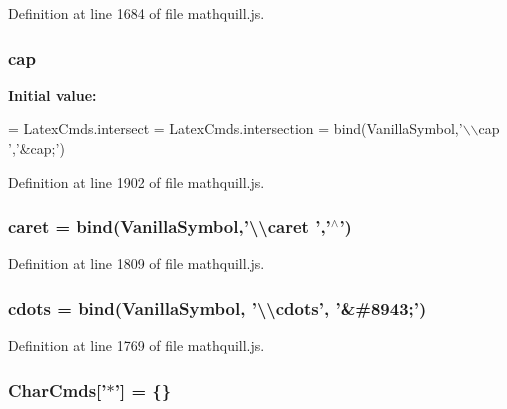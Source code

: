 Definition at line 1684 of file mathquill.\-js.

\subsubsection[{cap}]{ cap}\label{mathquill_8js_a27be4df60d86fa02a2939fa4992fd662}
{\bfseries Initial value\-:}
\begin{DoxyCode}
= LatexCmds.intersect = LatexCmds.intersection =
  bind(VanillaSymbol,\textcolor{stringliteral}{'\(\backslash\)\(\backslash\)cap '},\textcolor{stringliteral}{'&cap;'})
\end{DoxyCode}


Definition at line 1902 of file mathquill.\-js.

\subsubsection[{caret}]{ caret = {\bf bind}({\bf Vanilla\-Symbol},'\textbackslash{}\textbackslash{}caret ','$^\wedge$')}\label{mathquill_8js_aafbcfeddf0c2cec6df91b50e0abb3d50}


Definition at line 1809 of file mathquill.\-js.

\subsubsection[{cdots}]{ cdots = {\bf bind}({\bf Vanilla\-Symbol}, '\textbackslash{}\textbackslash{}cdots', '\&\#8943;')}\label{mathquill_8js_afedc3ca1217f6c597909464207f370d1}


Definition at line 1769 of file mathquill.\-js.

\subsubsection[{Char\-Cmds}]{\setlength{\rightskip}{0pt plus 5cm}Char\-Cmds['$\ast$'] = \{\}}\label{mathquill_8js_a11b61a3e088eeaffdb6c4e5f3701c195}


